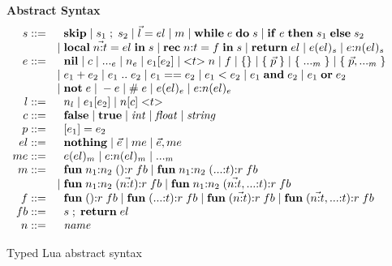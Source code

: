 \begin{figure}[!ht]
\textbf{Abstract Syntax}\\
\dstart
$$
\begin{array}{rl}
s ::= & \;\; \mathbf{skip} \; | \;
s_{1} \; ; \; s_{2} \; | \;
\vec{l} = el \; | \;
m \; | \;
\mathbf{while} \; e \; \mathbf{do} \; s \; | \;
\mathbf{if} \; e \; \mathbf{then} \; s_{1} \; \mathbf{else} \; s_{2}\\
& | \; \mathbf{local} \; \vec{n{:}t} = el \; \mathbf{in} \; s \; | \;
\mathbf{rec} \; n{:}t = f \; \mathbf{in} \; s \; | \;
\mathbf{return} \; el \; | \;
e(el)_{s} \; | \;
e{:}n(el)_{s}\\
e ::= & \;\; \mathbf{nil} \; | \;
c \; | \;
{...}_{e} \; | \;
n_{e} \; | \;
e_{1}[e_{2}] \; | \;
{<}t{>} \; n \; | \;
f \; | \;
\{ \} \; | \;
\{ \; \vec{p} \; \} \; | \;
\{ \; {...}_{m} \; \} \; | \;
\{ \; \vec{p},{...}_{m} \; \}\\
& | \; e_{1} + e_{2} \; | \;
e_{1} \; {..} \; e_{2} \; | \;
e_{1} == e_{2} \; | \;
e_{1} < e_{2} \; | \;
e_{1} \; \mathbf{and} \; e_{2} \; | \;
e_{1} \; \mathbf{or} \; e_{2} \\
& | \; \mathbf{not} \; e \; | \;
- e \; | \;
\# \; e \; | \;
e(el)_{e} \; | \;
e{:}n(el)_{e}\\
l ::= & \;\; n_{l} \; | \;
e_{1}[e_{2}] \; | \;
n[c] \; {<}t{>}\\
c ::= & \;\; \mathbf{false} \; | \;
\mathbf{true} \; | \;
{\it int} \; | \;
{\it float} \; | \;
{\it string}\\
p ::= & \;\; [e_{1}] = e_{2}\\
el ::= & \;\; \mathbf{nothing} \; | \;
\vec{e} \; | \;
me \; | \;
\vec{e}, me\\
me ::= & \;\; e(el)_{m} \; | \;
e{:}n(el)_{m} \; | \;
{...}_{m}\\
m ::= & \;\; \mathbf{fun} \; n_{1}{:}n_{2} \; (){:}r \; fb \; | \;
\mathbf{fun} \; n_{1}{:}n_{2} \; ({...}{:}t){:}r \; fb\\
& | \; \mathbf{fun} \; n_{1}{:}n_{2} \; (\vec{n{:}t}){:}r \; fb \; | \;
\mathbf{fun} \; n_{1}{:}n_{2} \; (\vec{n{:}t},{...}{:}t){:}r \; fb\\
f ::= & \;\; \mathbf{fun} \; (){:}r \; fb \; | \;
\mathbf{fun} \; ({...}{:}t){:}r \; fb \; | \;
\mathbf{fun} \; (\vec{n{:}t}){:}r \; fb \; | \;
\mathbf{fun} \; (\vec{n{:}t},{...}{:}t){:}r \; fb\\
fb ::= & \;\; s \;;\; \mathbf{return} \; el\\
n ::= & \;\; {\it name}\\
\end{array}
$$
\dend
\caption{Typed Lua abstract syntax}
\label{fig:syntax}
\end{figure}

